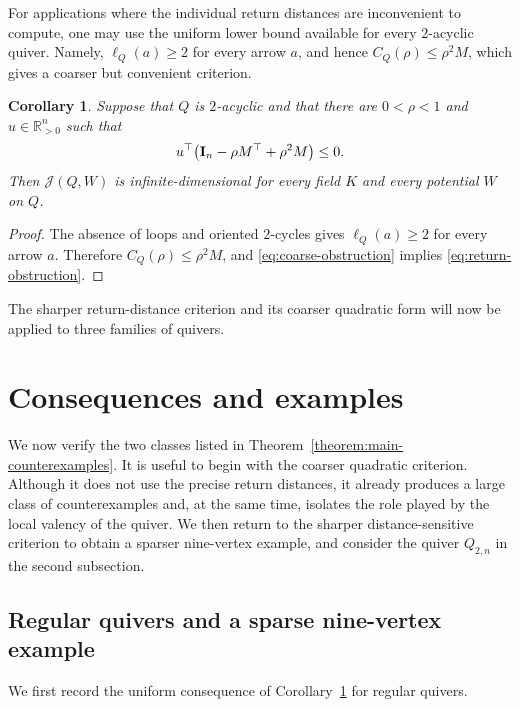 \documentclass[11pt,letterpaper,reqno]{amsart}
\newtheorem{corollary}[corollary]{Corollary}
\theoremstyle{definition}
\newcommand{\Jac}{\mathcal J}
\begin{document}
	For applications where the individual return distances are inconvenient to
	compute, one may use the uniform lower bound available for every
	$2$-acyclic quiver.  Namely, $\ell_Q(a)\geq2$ for every arrow $a$, and hence
	$C_Q(\rho)\leq\rho^2M$, which gives a coarser but convenient criterion.
	
	\begin{corollary}
		\label{corollary:coarse-obstruction}
		Suppose that $Q$ is $2$-acyclic and that there are $0<\rho<1$ and
		$u\in\mathbb R_{>0}^{n}$ such that
		\begin{equation}
			\label{eq:coarse-obstruction}
			u^{\top}
			\bigl({\bf I}_{n}-\rho M^{\top}+\rho^2M\bigr)
			\leq0.
		\end{equation}
		Then $\Jac(Q,W)$ is infinite-dimensional for every field $K$ and every
		potential $W$ on $Q$.
	\end{corollary}
	
	\begin{proof}
		The absence of loops and oriented $2$-cycles gives
		$\ell_Q(a)\geq2$ for every arrow $a$.  Therefore
		$C_Q(\rho)\leq\rho^2M$, and \eqref{eq:coarse-obstruction} implies
		\eqref{eq:return-obstruction}.
	\end{proof}
	
	The sharper return-distance criterion and its coarser quadratic form will
	now be applied to three families of quivers.
	
	

\section{Consequences and examples}
\label{sec:examples}

We now verify the two classes listed in
Theorem~\ref{theorem:main-counterexamples}.  It is useful to begin with the
coarser quadratic criterion.  Although it does not use the precise return
distances, it already produces a large class of counterexamples and, at the
same time, isolates the role played by the local valency of the quiver.  We
then return to the sharper distance-sensitive criterion to obtain a sparser
nine-vertex example, and consider the quiver $Q_{2,n}$ in the second subsection.

\subsection{Regular quivers and a sparse nine-vertex example}

We first record the uniform consequence of
Corollary~\ref{corollary:coarse-obstruction} for regular quivers.
\end{document}
